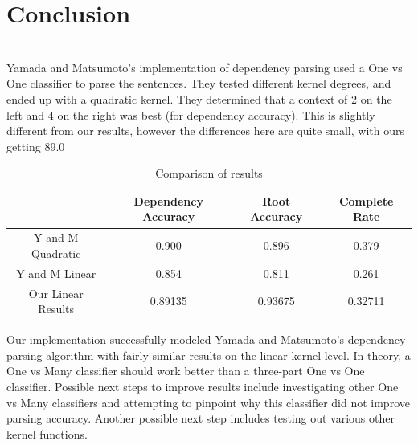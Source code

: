 \documentclass[12pt]{amsart}
\begin{document}
\section{Conclusion}

\noindent \\
Yamada and Matsumoto's implementation of dependency parsing used a One vs One classifier to parse the sentences. They tested different kernel degrees, and ended up with a quadratic kernel. They determined that a context of 2 on the left and 4 on the right was best (for dependency accuracy). This is slightly different from our results, however the differences here are quite small, with ours getting 89.0%
\begin{table}
\caption{Comparison of results}
 \begin{tabular}{cccc}
            \hline \hline & Dependency Accuracy & Root Accuracy & Complete Rate \\ \hline
            Y and M Quadratic & 0.900 & 0.896 & 0.379 \\ 
            Y and M Linear & 0.854 & 0.811 & 0.261 \\ 
            Our Linear Results & 0.89135 & 0.93675 & 0.32711 \\
            \hline

        \end{tabular}
\end{table}
Our implementation successfully modeled Yamada and Matsumoto's dependency parsing algorithm with fairly similar results on the linear kernel level. In theory, a One vs Many classifier should work better than a three-part One vs One classifier. Possible next steps to improve results include investigating other One vs Many classifiers and attempting to pinpoint why this classifier did not improve parsing accuracy. Another possible next step includes testing out various other kernel functions. \\
        


        

\end{document}
